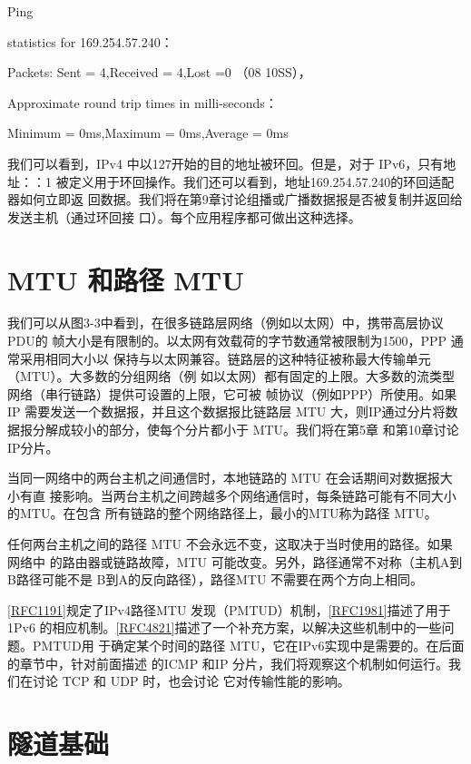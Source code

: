 Ping

statistics for 169.254.57.240：

Packets: Sent = 4,Received = 4,Lost =0 （08 10SS），

Approximate round trip times in milli-seconds：

Minimum = 0ms,Maximum = 0ms,Average = 0ms

我们可以看到，IPv4 中以127开始的目的地址被环回。但是，对于 IPv6，只有地址：：1
被定义用于环回操作。我们还可以看到，地址169.254.57.240的环回适配器如何立即返
回数据。我们将在第9章讨论组播或广播数据报是否被复制并返回给发送主机（通过环回接
口）。每个应用程序都可做出这种选择。

\section{MTU 和路径 MTU}

我们可以从图3-3中看到，在很多链路层网络（例如以太网）中，携带高层协议 PDU的
帧大小是有限制的。以太网有效载荷的字节数通常被限制为1500，PPP 通常采用相同大小以
保持与以太网兼容。链路层的这种特征被称最大传输单元（MTU）。大多数的分组网络（例
如以太网）都有固定的上限。大多数的流类型网络（串行链路）提供可设置的上限，它可被
帧协议（例如PPP）所使用。如果IP 需要发送一个数据报，并且这个数据报比链路层 MTU
大，则IP通过分片将数据报分解成较小的部分，使每个分片都小于 MTU。我们将在第5章
和第10章讨论IP分片。

当同一网络中的两台主机之间通信时，本地链路的 MTU 在会话期间对数据报大小有直
接影响。当两台主机之间跨越多个网络通信时，每条链路可能有不同大小的MTU。在包含
所有链路的整个网络路径上，最小的MTU称为路径 MTU。

任何两台主机之间的路径 MTU 不会永远不变，这取决于当时使用的路径。如果网络中
的路由器或链路故障，MTU 可能改变。另外，路径通常不对称（主机A到B路径可能不是
B到A的反向路径），路径MTU 不需要在两个方向上相同。

\href{https://www.rfc-editor.org/rfc/rfc1191}{[RFC1191]}规定了IPv4路径MTU 发现（PMTUD）机制，\href{https://www.rfc-editor.org/rfc/rfc1981}{[RFC1981]}描述了用于1Pv6
的相应机制。\href{https://www.rfc-editor.org/rfc/rfc4821}{[RFC4821]}描述了一个补充方案，以解决这些机制中的一些问题。PMTUD用
于确定某个时间的路径 MTU，它在IPv6实现中是需要的。在后面的章节中，针对前面描述
的ICMP 和IP 分片，我们将观察这个机制如何运行。我们在讨论 TCP 和 UDP 时，也会讨论
它对传输性能的影响。

\section{隧道基础}

